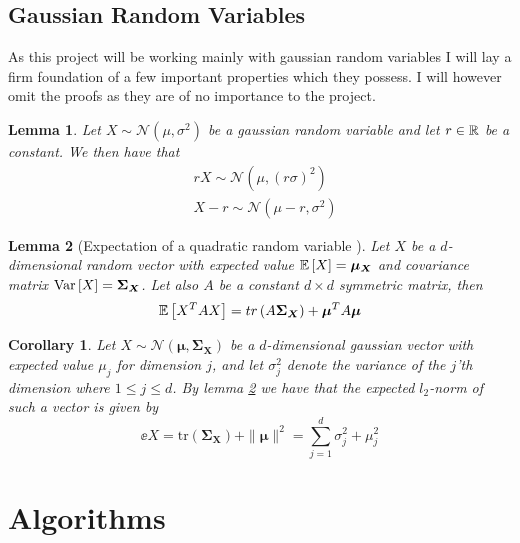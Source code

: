 \documentclass[a4paper,12pt]{article}
\newtheorem{corollary}{Corollary}[section]
\newtheorem{lemma}{Lemma}[section]
\begin{document}
\subsection{Gaussian Random Variables}
As this project will be working mainly with gaussian random variables I will 
lay a firm foundation of a few important properties which they possess. 
I will however omit the proofs as they are of no importance to the project.

\begin{lemma}
\label{lem:GaussTrans}
Let $X \sim \mathcal{N}(\mu, \sigma^2)$ be a gaussian random variable and let $r \in \mathbb{R}$ be a constant.
We then have that
\begin{align*}
    &rX \sim \mathcal{N}(\mu, (r\sigma)^2) \\
    &X - r \sim \mathcal{N}(\mu-r, \sigma^2) 
\end{align*}
    
\end{lemma}

\begin{lemma}[Expectation of a quadratic random variable \cite{BatesQuadForm}]
\label{lem:ExpQuad}
Let $X$ be a $d$-dimensional random vector with expected value $\mathbb{E} \left [ X  \right] =  \bm{\mu_{X}}$
and covariance matrix $\text{Var} \left [ X  \right] = \bm{\Sigma_{X}}$. Let also $A$ be a constant 
$d \times d$ symmetric matrix, then 
\[
    \mathbb{E} \left [ X^T A X  \right] = tr \left (A \bm{\Sigma_X}\right) + \bm{\mu}^T A\bm{\mu}
\]
\end{lemma}

\begin{corollary}
\label{cor:expNorm}
Let $X \sim \mathcal{N}(\bm{\mu}, \bm{\Sigma_X})$ be a $d$-dimensional gaussian vector
with expected value $\mu_j$ for dimension $j$, and let $\sigma_j^2$ denote the variance of the 
$j$'th dimension where $1 \le j \le d$.
By lemma \ref{lem:ExpQuad} we have that the expected $l_2$-norm 
of such a vector is given by
\[
    \ee{X} = \text{tr} (\bm{\Sigma_X}) + \|\bm{\mu}\|^2 = \sum_{j=1}^d \sigma_j^2 + \mu_j^2
\]
\end{corollary}


\section{Algorithms}
\end{document}
